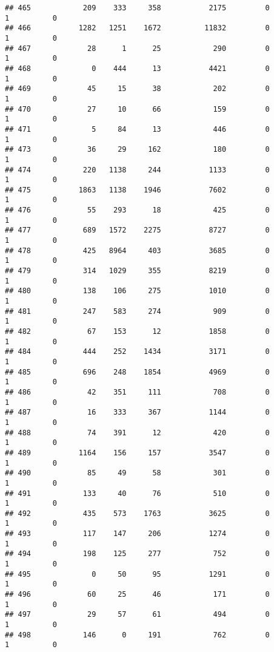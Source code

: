 \documentclass[
]{article}
\begin{document}
\begin{verbatim}
## 465            209    333     358           2175         0         1          0
## 466           1282   1251    1672          11832         0         1          0
## 467             28      1      25            290         0         1          0
## 468              0    444      13           4421         0         1          0
## 469             45     15      38            202         0         1          0
## 470             27     10      66            159         0         1          0
## 471              5     84      13            446         0         1          0
## 473             36     29     162            180         0         1          0
## 474            220   1138     244           1133         0         1          0
## 475           1863   1138    1946           7602         0         1          0
## 476             55    293      18            425         0         1          0
## 477            689   1572    2275           8727         0         1          0
## 478            425   8964     403           3685         0         1          0
## 479            314   1029     355           8219         0         1          0
## 480            138    106     275           1010         0         1          0
## 481            247    583     274            909         0         1          0
## 482             67    153      12           1858         0         1          0
## 484            444    252    1434           3171         0         1          0
## 485            696    248    1854           4969         0         1          0
## 486             42    351     111            708         0         1          0
## 487             16    333     367           1144         0         1          0
## 488             74    391      12            420         0         1          0
## 489           1164    156     157           3547         0         1          0
## 490             85     49      58            301         0         1          0
## 491            133     40      76            510         0         1          0
## 492            435    573    1763           3625         0         1          0
## 493            117    147     206           1274         0         1          0
## 494            198    125     277            752         0         1          0
## 495              0     50      95           1291         0         1          0
## 496             60     25      46            171         0         1          0
## 497             29     57      61            494         0         1          0
## 498            146      0     191            762         0         1          0

\end{verbatim}
\end{document}
